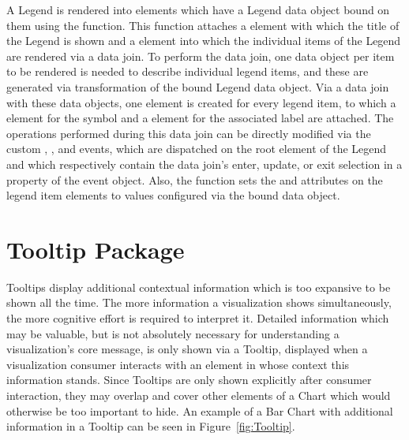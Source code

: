A Legend is rendered into elements which have a Legend data object
bound on them using the  function. This function
attaches a  element with which the title of the Legend
is shown and a  element into which the individual items of
the Legend are rendered via a data join. To perform the data join, one
 data object per item to be rendered is needed to
describe individual legend items, and these are generated via
transformation of the bound Legend data object. Via a data join with
these data objects, one  element is created for every
legend item, to which a  element for the symbol and a
 element for the associated label are attached. The
operations performed during this data join can be directly modified
via the custom , , and  events,
which are dispatched on the root element of the Legend and which
respectively contain the data join's enter, update, or exit selection
in a property of the event object. Also, the 
function sets the  and 
attributes on the legend item elements to values configured via the
bound data object.






\section{Tooltip Package}
\label{sec:TooltipPackage}

Tooltips display additional contextual information which is too
expansive to be shown all the time. The more information a
visualization shows simultaneously, the more cognitive effort is
required to interpret it. Detailed information which may be valuable,
but is not absolutely necessary for understanding a visualization's
core message, is only shown via a Tooltip, displayed when a
visualization consumer interacts with an element in whose context this
information stands. Since Tooltips are only shown explicitly after
consumer interaction, they may overlap and cover other elements of a
Chart which would otherwise be too important to hide. An example of a
Bar Chart with additional information in a Tooltip can be seen in
Figure~\ref{fig:Tooltip}.


